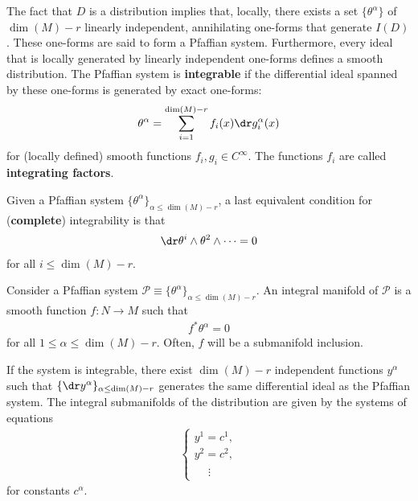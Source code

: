     \begin{property}\label{bundle:pfaff}
        The fact that $D$ is a distribution implies that, locally, there exists a set $\{\theta^\alpha\}$ of $\dim(M)-r$ linearly independent, annihilating one-forms that generate $I(D)$. These one-forms are said to form a Pfaffian system. Furthermore, every ideal that is locally generated by linearly independent one-forms defines a smooth distribution. The Pfaffian system is \textbf{integrable} if the differential ideal spanned by these one-forms is generated by exact one-forms:
        \begin{gather}
            \theta^\alpha = \sum_{i=1}^{\dim(M)-r}f_i(x)\dr g_i^\alpha(x)
        \end{gather}
        for (locally defined) smooth functions $f_i,g_i\in C^\infty$. The functions $f_i$ are called \textbf{integrating factors}.

        Given a Pfaffian system $\{\theta^\alpha\}_{\alpha\leq\dim(M)-r}$, a last equivalent condition for (\textbf{complete}) integrability is that
        \begin{gather}
            \label{bundle:integrable_wedge_condition}
            \dr\theta^i\wedge\theta^2\wedge\cdots = 0
        \end{gather}
        for all $i\leq \dim(M)-r$.
    \end{property}

    \begin{property}
        Consider a Pfaffian system $\mathcal{P}\equiv\{\theta^\alpha\}_{\alpha\leq\dim(M)-r}$. An integral manifold of $\mathcal{P}$ is a smooth function $f:N\rightarrow M$ such that
        \begin{gather}
            f^*\theta^\alpha=0
        \end{gather}
        for all $1\leq\alpha\leq\dim(M)-r$. Often, $f$ will be a submanifold inclusion.

        If the system is integrable, there exist $\dim(M)-r$ independent functions $y^\alpha$ such that $\{\dr y^\alpha\}_{\alpha\leq\dim(M)-r}$ generates the same differential ideal as the Pfaffian system. The integral submanifolds of the distribution are given by the systems of equations
        \begin{gather}
            \begin{cases}
                y^1 = c^1,\\
                y^2 = c^2,\\
                \phantom{y^i\ \ }\vdots
            \end{cases}
        \end{gather}
        for constants $c^\alpha$.
    \end{property}

